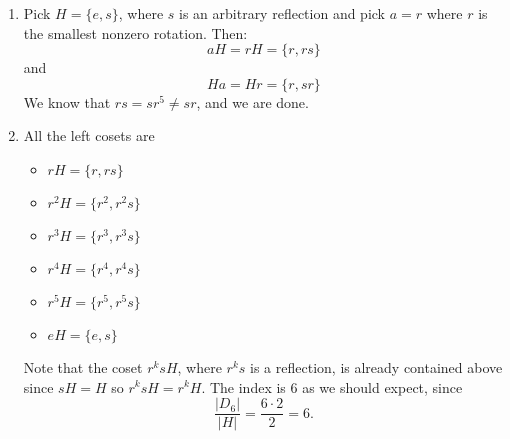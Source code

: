 \begin{sol}
\begin{enumerate}[label=(\alph*)]
    \item Pick $H=\{e,s\}$, where $s$ is an arbitrary reflection and pick $a=r$ where $r$ is the smallest nonzero rotation. Then:
    $$
        aH = rH = \{r,rs\}
    $$
    and
    $$
        Ha = Hr = \{r,sr\}
    $$
    We know that $rs = sr^5 \neq sr$, and we are done.
    \item All the left cosets are
    \begin{itemize}
        \item $rH=\{r,rs\}$
        \item $r^2H = \{r^2,r^2s\}$
        \item $r^3H = \{r^3, r^3s\}$
        \item $r^4H = \{r^4, r^4s\}$
        \item $r^5H = \{r^5, r^5s\}$
        \item $eH = \{e,s\}$
    \end{itemize}
    Note that the coset $r^ksH$, where $r^ks$ is a reflection, is already contained above since $sH=H$ so $r^ksH = r^kH$. The index is $6$ as we should expect, since
    $$
    \frac{|D_6|}{|H|} = \frac{6\cdot 2}{2}=6.
    $$
\end{enumerate}
\end{sol}